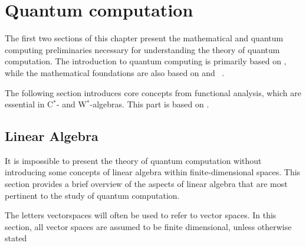 \chapter{Quantum computation}\label{ch:qc}

The first two sections of this chapter present the mathematical and quantum computing preliminaries necessary for understanding the theory of quantum computation. 
The introduction to quantum computing is primarily based on \cite{nielsen2010quantum,watrous2018theory}, while the mathematical foundations are also based on \cite{rudin91functional} and  \cite{guide2006infinite}.

The following section introduces core concepts from functional analysis, which are essential in C$^*$- and W$^*$-algebras. This part is based on \cite{rudin91functional,guide2006infinite,conwayCourseFunctionalAnalysis2007,conwayCourseOperatorTheory2000}.



\section{Linear Algebra} \label{sec:linalg}



It is impossible to present the theory of quantum computation without introducing some concepts of linear algebra within finite-dimensional spaces. This section provides a brief overview of the aspects of linear algebra that are most pertinent to the study of quantum computation. 


The letters \gls{vectorspaces} will often be used to refer to vector spaces. In this section, all vector spaces are assumed to be finite dimensional, unless otherwise stated



